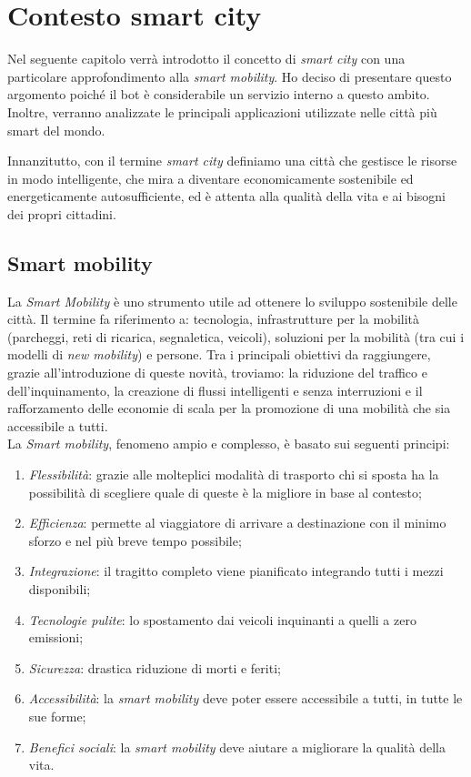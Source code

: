 \chapter{Contesto smart city}
\label{cha:smartcity}

Nel seguente capitolo verrà introdotto il concetto di \textit{smart city} con una particolare approfondimento alla \textit{smart mobility}. Ho deciso di presentare questo argomento poiché il bot è considerabile un servizio interno a questo ambito. Inoltre, verranno analizzate le principali applicazioni utilizzate nelle città più smart del mondo.

Innanzitutto, con il termine \textit{smart city} definiamo una città che gestisce le risorse in modo intelligente, che mira a diventare economicamente sostenibile ed energeticamente autosufficiente, ed è attenta alla qualità della vita e ai bisogni dei propri cittadini\cite{SmarCity}.

\section{Smart mobility}
\label{sec:smart-mobility}

La \textit{Smart Mobility} è uno strumento utile ad ottenere lo sviluppo sostenibile delle città. Il termine fa riferimento a: tecnologia, infrastrutture per la mobilità (parcheggi, reti di ricarica, segnaletica, veicoli), soluzioni per la mobilità (tra cui i modelli di \textit{new mobility}) e persone. Tra i principali obiettivi da raggiungere, grazie all'introduzione di queste novità, troviamo: la riduzione del traffico e dell'inquinamento, la creazione di flussi intelligenti e senza interruzioni e il rafforzamento delle economie di scala per la promozione di una mobilità che sia accessibile a tutti. \cite{SmartMobility}\\

\noindent La\textit{ Smart mobility}, fenomeno ampio e complesso, è basato sui seguenti principi:

\begin{enumerate}
    \item  \textit{Flessibilità}: grazie alle molteplici modalità di trasporto chi si sposta ha la possibilità di scegliere quale di queste è la migliore in base al contesto;
    \item  \textit{Efficienza}: permette al viaggiatore di arrivare a destinazione con il minimo sforzo e nel più breve tempo possibile;
    \item  \textit{Integrazione}: il tragitto completo viene pianificato integrando tutti i mezzi disponibili;
    \item \textit{Tecnologie pulite}: lo spostamento dai veicoli inquinanti a quelli a zero emissioni;
    \item \textit{Sicurezza}: drastica riduzione di morti e feriti; 
    \item \textit{Accessibilità}: la \textit{smart mobility} deve poter essere accessibile a tutti, in tutte le sue forme;
    \item \textit{Benefici sociali}: la \textit{smart mobility} deve aiutare a migliorare la qualità della vita. 
\end{enumerate}

